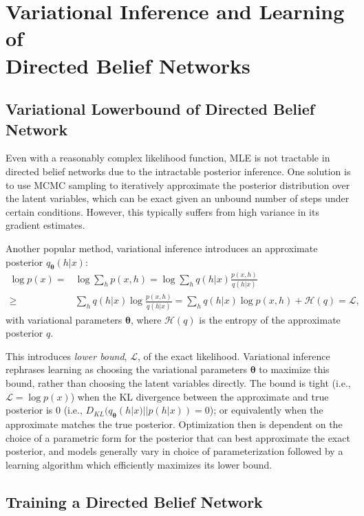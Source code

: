 \documentclass{article} %
\newcommand{\vects}[1]{\boldsymbol{#1}}
\newcommand{\TT}[0]{\vects{\theta}}
\newcommand{\LL}[0]{\mathcal{L}}
\newcommand{\HH}[0]{\mathcal{H}}
\begin{document}
\section{Variational Inference and Learning of \\ Directed Belief Networks}

\subsection{Variational Lowerbound of Directed Belief Network}

Even with a reasonably complex likelihood function, MLE is not tractable in
directed belief networks due to the intractable posterior inference.  One
solution is to use MCMC sampling to iteratively approximate the posterior
distribution over the latent variables, which can be exact given an unbound number
of steps under certain conditions. However, this typically suffers from high variance in its
gradient estimates.

Another popular method, variational inference introduces an approximate
posterior $q_{\TT}(h|x)$:
\begin{align}
    \label{eq:approx_logp}
    \log p(x) =& \log \sum_{h} p(x, h) 
    = \log \sum_h q(h|x) \frac{p(x, h)}{q(h|x)} \nonumber \\
    \geq& \sum_h q(h|x) \log \frac{p(x, h)}{q(h|x)} 
    = \sum_h q(h|x) \log p(x,h) + \HH(q) = \LL,
\end{align}
with variational parameters $\TT$, where $\HH(q)$ is the entropy of the
approximate posterior $q$. 

This introduces \emph{lower bound}, $\LL$, of the exact likelihood. Variational
inference rephrases learning as choosing the variational parameters $\TT$ to
maximize this bound, rather than choosing the latent variables directly. The
bound is tight (i.e., $\LL = \log p(x)$) when the KL divergence between the
approximate and true posterior is $0$ (i.e., $D_{KL}(q_{\TT}(h|x)||p(h|x)) =
0$); or equivalently when the approximate matches the true posterior.
Optimization then is dependent on the choice of a parametric form for the
posterior that can best approximate the exact posterior, and models generally
vary in choice of parameterization followed by a learning algorithm which
efficiently maximizes its lower bound.

\subsection{Training a Directed Belief Network}
\end{document}
